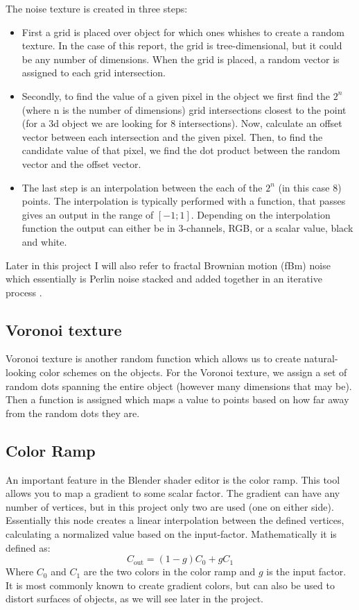 \documentclass[a4paper, 12pt]{olplainarticle}
\begin{document}
The noise texture is created in three steps:
\begin{itemize}
    \item First a grid is placed over object for which ones whishes to create a random texture. In the case of this report, the grid is tree-dimensional, but it could be any number of dimensions.
    When the grid is placed, a random vector is assigned to each grid intersection.
    \item Secondly, to find the value of a given pixel in the object we first find the $2^n$ (where n is the number of dimensions) grid intersections closest to the point (for a 3d object we are looking for 8 intersections).
    Now, calculate an offset vector between each intersection and the given pixel. Then, to find the candidate value of that pixel, we find the dot product between the random vector and the offset vector.
    \item The last step is an interpolation between the each of the $2^n$ (in this case 8) points. The interpolation is typically performed with a function, that passes gives an output in the range of $[-1;1]$. 
    Depending on the interpolation function the output can either be in 3-channels, RGB, or a scalar value, black and white.
\end{itemize}
Later in this project I will also refer to fractal Brownian motion (fBm) noise which essentially is Perlin noise stacked and added together in an iterative process \citep{bookofshaders}.

\subsection{Voronoi texture}
Voronoi texture is another random function which allows us to create natural-looking color schemes on the objects.
For the Voronoi texture, we assign a set of random dots spanning the entire object (however many dimensions that may be). 
Then a function is assigned which maps a value to points based on how far away from the random dots they are.

\subsection{Color Ramp}
An important feature in the Blender shader editor is the color ramp. This tool allows you to map a gradient to some scalar factor.
The gradient can have any number of vertices, but in this project only two are used (one on either side). 
Essentially this node creates a linear interpolation between the defined vertices, calculating a normalized value based on the input-factor. Mathematically it is defined as:
$$ C_{\text{out}} = (1-g)C_0 + gC_1 $$
Where $C_0$ and $C_1$ are the two colors in the color ramp and $g$ is the input factor.
It is most commonly known to create gradient colors, but can also be used to distort surfaces of objects, as we will see later in the project. 
\end{document}
